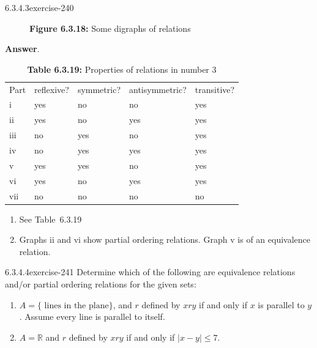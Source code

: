 \documentclass[twoside,10pt,]{book}
\numberwithin{equation}{section}
\begin{document}
\begin{divisionsolution}{6.3.4.3}{}{exercise-240}
\begin{figure}
\caption*{\textbf{Figure 6.3.18:} Some digraphs of relations}
\end{figure}
\par\smallskip%
\noindent\textbf{Answer}.\quad%
\leavevmode%
\begin{table}
\centering
\begin{tabular}{lllll}
Part&reflexive?&symmetric?&antisymmetric?&transitive?\tabularnewline[0pt]
i&yes&no&no&yes\tabularnewline[0pt]
ii&yes&no&yes&yes\tabularnewline[0pt]
iii&no&yes&no&yes\tabularnewline[0pt]
iv&no&yes&yes&yes\tabularnewline[0pt]
v&yes&yes&no&yes\tabularnewline[0pt]
vi&yes&no&yes&yes\tabularnewline[0pt]
vii&no&no&no&no
\end{tabular}
\caption*{\textbf{Table 6.3.19:} Properties of relations in number 3}
\end{table}
\hypertarget{p-2062}{}%
\leavevmode%
\begin{enumerate}[label=(\roman*)]
\item\hypertarget{li-1086}{}\hypertarget{p-2063}{}%
See Table~6.3.19%
\item\hypertarget{li-1087}{}\hypertarget{p-2064}{}%
Graphs ii and vi show partial ordering relations. Graph v is of an equivalence relation.%
\end{enumerate}
%
\end{divisionsolution}%
\begin{divisionsolution}{6.3.4.4}{}{exercise-241}%
\hypertarget{p-2065}{}%
Determine which of the following are equivalence relations and\slash{}or partial ordering relations for the given sets:%
\par
\hypertarget{p-2066}{}%
\leavevmode%
\begin{enumerate}[label=(\alph*)]
\item\hypertarget{li-1088}{}\hypertarget{p-2067}{}%
\(A = \{\textrm{ lines in the plane}\}\), and \(r\) defined by  \(x r y\) if and only if \(x\) is parallel to \(y\).  Assume every line is parallel to itself.%
\item\hypertarget{li-1089}{}\hypertarget{p-2068}{}%
\(A = \mathbb{R}\) and \(r\) defined by  \(x r y\) if and only if \(\lvert x -y \rvert \leq  7\).%
\end{enumerate}
%
\end{divisionsolution}%
\end{document}
